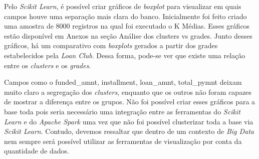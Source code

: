 Pelo \emph{Scikit Learn}, é possível criar gráficos de \emph{boxplot} para visualizar em quais campos houve uma separação mais clara do banco. Inicialmente foi feito criado uma amostra de 8000 registros na qual foi executado o K Médias. Esses gráficos estão disponível em Anexos na seção Análise dos clusters vs grades. Junto desses gráficos, há um comparativo com \emph{boxplots} gerados a partir dos grades estabelecidos pela \emph{Loan Club}. Dessa forma, pode-se ver que existe uma relação entre os \emph{clusters} e os \emph{grades}.

Campos como o funded\_amnt, installment, loan\_amnt, total\_pymnt deixam muito claro a segregação dos \emph{clusters}, enquanto que os outros não foram capazes de mostrar a diferença entre os grupos.
Não foi possível criar esses gráficos para a base toda pois seria necessário uma integração entre as ferramentas do \emph{Scikit Learn} e do \emph{Apache Spark} uma vez que não foi possível clusterizar toda a base via \emph{Scikit Learn}. Contudo, devemos ressaltar que dentro de um contexto de \emph{Big Data} nem sempre será possível utilizar as ferramentas de visualização por conta da quantidade de dados.


